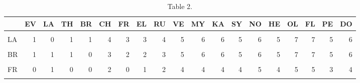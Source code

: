 \begin{table}[H]

\caption{Table 2.}
\centering
\fontsize{8}{10}\selectfont
\begin{tabular}[t]{lrrrrrrrrrrrrrrrrrr}
\toprule
  & EV & LA & TH & BR & CH & FR & EL & RU & VE & MY & KA & SY & NO & HE & OL & FL & PE & DO\\
\midrule
\cellcolor{gray!6}{EV} & \cellcolor{gray!6}{0} & \cellcolor{gray!6}{2} & \cellcolor{gray!6}{1} & \cellcolor{gray!6}{2} & \cellcolor{gray!6}{5} & \cellcolor{gray!6}{3} & \cellcolor{gray!6}{4} & \cellcolor{gray!6}{4} & \cellcolor{gray!6}{6} & \cellcolor{gray!6}{6} & \cellcolor{gray!6}{6} & \cellcolor{gray!6}{6} & \cellcolor{gray!6}{7} & \cellcolor{gray!6}{7} & \cellcolor{gray!6}{7} & \cellcolor{gray!6}{7} & \cellcolor{gray!6}{5} & \cellcolor{gray!6}{6}\\
LA & 1 & 0 & 1 & 1 & 4 & 3 & 3 & 4 & 5 & 6 & 6 & 5 & 6 & 5 & 7 & 7 & 5 & 6\\
\cellcolor{gray!6}{TH} & \cellcolor{gray!6}{1} & \cellcolor{gray!6}{2} & \cellcolor{gray!6}{0} & \cellcolor{gray!6}{2} & \cellcolor{gray!6}{4} & \cellcolor{gray!6}{3} & \cellcolor{gray!6}{3} & \cellcolor{gray!6}{3} & \cellcolor{gray!6}{5} & \cellcolor{gray!6}{6} & \cellcolor{gray!6}{6} & \cellcolor{gray!6}{5} & \cellcolor{gray!6}{6} & \cellcolor{gray!6}{6} & \cellcolor{gray!6}{7} & \cellcolor{gray!6}{7} & \cellcolor{gray!6}{5} & \cellcolor{gray!6}{6}\\
BR & 1 & 1 & 1 & 0 & 3 & 2 & 2 & 3 & 5 & 6 & 6 & 5 & 6 & 5 & 7 & 7 & 5 & 6\\
\cellcolor{gray!6}{CH} & \cellcolor{gray!6}{1} & \cellcolor{gray!6}{1} & \cellcolor{gray!6}{0} & \cellcolor{gray!6}{0} & \cellcolor{gray!6}{0} & \cellcolor{gray!6}{1} & \cellcolor{gray!6}{1} & \cellcolor{gray!6}{1} & \cellcolor{gray!6}{3} & \cellcolor{gray!6}{4} & \cellcolor{gray!6}{4} & \cellcolor{gray!6}{3} & \cellcolor{gray!6}{3} & \cellcolor{gray!6}{3} & \cellcolor{gray!6}{4} & \cellcolor{gray!6}{4} & \cellcolor{gray!6}{4} & \cellcolor{gray!6}{4}\\
\addlinespace
FR & 0 & 1 & 0 & 0 & 2 & 0 & 1 & 2 & 4 & 4 & 4 & 4 & 5 & 4 & 5 & 5 & 3 & 4\\
\cellcolor{gray!6}{EL} & \cellcolor{gray!6}{1} & \cellcolor{gray!6}{1} & \cellcolor{gray!6}{0} & \cellcolor{gray!6}{0} & \cellcolor{gray!6}{2} & \cellcolor{gray!6}{1} & \cellcolor{gray!6}{0} & \cellcolor{gray!6}{1} & \cellcolor{gray!6}{3} & \cellcolor{gray!6}{4} & \cellcolor{gray!6}{4} & \cellcolor{gray!6}{3} & \cellcolor{gray!6}{4} & \cellcolor{gray!6}{3} & \cellcolor{gray!6}{5} & \cellcolor{gray!6}{5} & \cellcolor{gray!6}{3} & \cellcolor{gray!6}{4}\\

\end{tabular}
\end{table}
